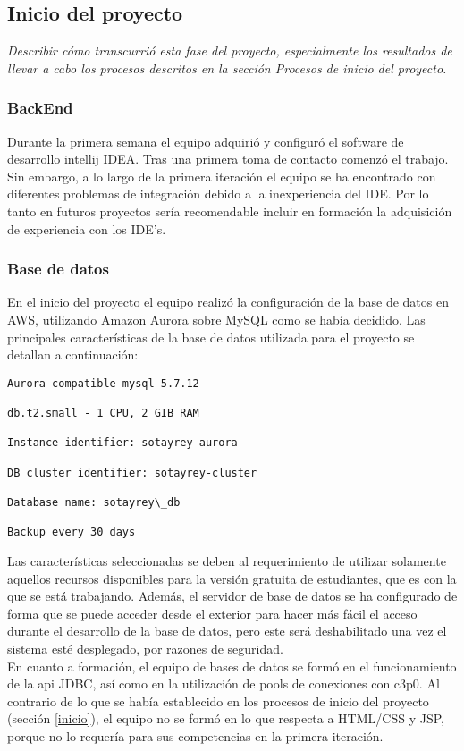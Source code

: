 \subsection{Inicio del proyecto}
\label{Inicio del proyecto}
\emph{Describir cómo transcurrió esta fase del proyecto, especialmente los resultados de llevar a cabo los procesos descritos en la sección Procesos de inicio del proyecto.}
\subsubsection*{BackEnd}
Durante la primera semana el equipo adquirió y configuró el software de desarrollo intellij IDEA. Tras una primera toma de contacto comenzó el trabajo. Sin embargo, a lo largo de la primera iteración el equipo se ha encontrado con diferentes problemas de integración debido a la inexperiencia del IDE. Por lo tanto en futuros proyectos sería recomendable incluir en formación la adquisición de experiencia con los IDE's.
\subsubsection*{Base de datos}
En el inicio del proyecto el equipo realizó la configuración de la base de datos en AWS, utilizando Amazon Aurora sobre MySQL como se había decidido. Las principales características de la base de datos utilizada para el proyecto se detallan a continuación:

\begin{lstlisting}
Aurora compatible mysql 5.7.12

db.t2.small - 1 CPU, 2 GIB RAM

Instance identifier: sotayrey-aurora

DB cluster identifier: sotayrey-cluster

Database name: sotayrey\_db

Backup every 30 days
\end{lstlisting}

Las características seleccionadas se deben al requerimiento de utilizar solamente aquellos recursos disponibles para la versión gratuita de estudiantes, que es con la que se está trabajando. Además, el servidor de base de datos se ha configurado de forma que se puede acceder desde el exterior para hacer más fácil el acceso durante el desarrollo de la base de datos, pero este será deshabilitado una vez el sistema esté desplegado, por razones de seguridad.\\

En cuanto a formación, el equipo de bases de datos se formó en el funcionamiento de la api JDBC, así como en la utilización de pools de conexiones con c3p0. Al contrario de lo que se había establecido en los procesos de inicio del proyecto (sección \ref{inicio}), el equipo no se formó en lo que respecta a HTML/CSS y JSP, porque no lo requería para sus competencias en la primera iteración.
